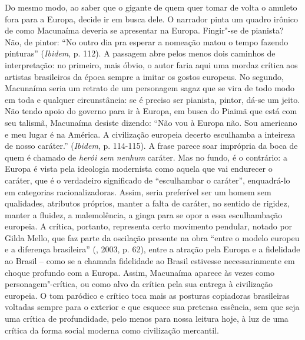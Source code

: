 Do mesmo modo, ao saber que o gigante de quem quer tomar de volta o
amuleto fora para a Europa, decide ir em busca dele. O narrador pinta um
quadro irônico de como Macunaíma deveria se apresentar na Europa.
Fingir"-se de pianista? Não, de pintor: ``No outro dia pra esperar a
nomeação matou o tempo fazendo pinturas'' (\emph{Ibidem}, p. 112). A
passagem abre pelos menos dois caminhos de interpretação: no primeiro,
mais óbvio, o autor faria aqui uma mordaz crítica aos artistas
brasileiros da época sempre a imitar os gostos europeus. No segundo,
Macunaíma seria um retrato de um personagem sagaz que se vira de todo
modo em toda e qualquer circunstância: se é preciso ser pianista,
pintor, dá-se um jeito. Não tendo apoio do governo para ir à Europa, em
busca do Piaimã que está com seu talismã, Macunaíma desiste dizendo:
``Não vou à Europa não. Sou americano e meu lugar é na América. A
civilização europeia decerto esculhamba a inteireza de nosso caráter.''
(\emph{Ibidem}, p. 114-115). A frase parece soar imprópria da boca de
quem é chamado de \emph{herói sem nenhum} caráter. Mas no fundo, é o
contrário: a Europa é vista pela ideologia modernista como aquela que
vai endurecer o caráter, que é o verdadeiro significado de ``esculhambar
o caráter'', enquadrá-lo em categorias racionalizadoras. Assim, seria
preferível ser um homem sem qualidades, atributos próprios, manter a
falta de caráter, no sentido de rigidez, manter a
fluidez, a malemolência, a ginga para se opor a essa esculhambação
europeia. A crítica, portanto, representa certo movimento pendular,
notado por Gilda Mello, que faz parte da oscilação presente na obra
``entre o modelo europeu e a diferença brasileira'' (, 2003, p.
62), entre a atração pela Europa e a fidelidade ao Brasil -- como se a
chamada fidelidade ao Brasil estivesse necessariamente em choque
profundo com a Europa. Assim, Macunaíma aparece às vezes como
personagem"-crítica, ou como alvo da crítica pela sua entrega à
civilização europeia. O tom paródico e crítico toca mais as posturas
copiadoras brasileiras voltadas sempre para o exterior e que esquece sua
pretensa essência, sem que seja uma crítica de profundidade, pelo menos
para nossa leitura hoje, à luz de uma crítica da forma social moderna
como civilização mercantil.

